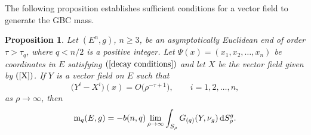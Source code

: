 \documentclass[pdftex]{sigma}
\numberwithin{equation}{section}
\newtheorem{Proposition}[Theorem]{Proposition}
\begin{document}
The following proposition establishes sufficient conditions for a vector field
to generate the GBC mass.
\begin{Proposition} \label{mass using another vector field}
   Let $(E^n,g)$, $n \geq 3$, be an asymptotically Euclidean end of order $\tau > \tau_q$, where $q < n/2$ is a positive integer. Let $\Psi(x) = (x_1, x_2, \ldots, x_n)$ be coordinates in $E$ satisfying $(\ref{decay conditions})$ and let $X$ be the vector field given by $(\ref{X})$.
  If $Y$ is a vector field on $E$ such that
  \begin{equation*}
   \bigl(Y^i - X^i\bigr)(x) = O\bigl(\rho^{-\tau + 1}\bigr), \qquad i = 1, 2, \ldots, n,
  \end{equation*}
  as $\rho \to \infty$, then
  \begin{equation*}
   \mathrm{m}_q(E,g) = -b(n,q) \lim_{\rho \to \infty} \int_{S_\rho} G_{(q)} (Y, \nu_g) \, {\rm d}S_\rho^g.
  \end{equation*}
\end{Proposition}
\end{document}
